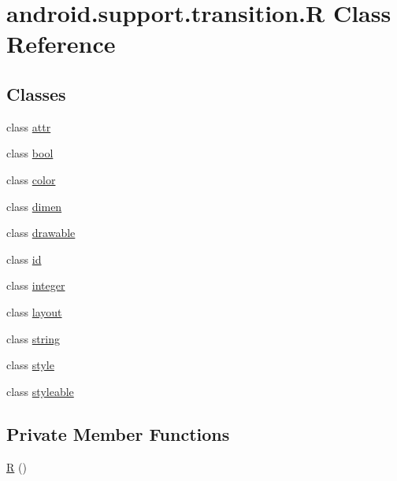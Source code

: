 \hypertarget{classandroid_1_1support_1_1transition_1_1_r}{}\section{android.\+support.\+transition.\+R Class Reference}
\label{classandroid_1_1support_1_1transition_1_1_r}
\subsection*{Classes}
\begin{DoxyCompactItemize}
\item 
class \mbox{\hyperlink{classandroid_1_1support_1_1transition_1_1_r_1_1attr}{attr}}
\item 
class \mbox{\hyperlink{classandroid_1_1support_1_1transition_1_1_r_1_1bool}{bool}}
\item 
class \mbox{\hyperlink{classandroid_1_1support_1_1transition_1_1_r_1_1color}{color}}
\item 
class \mbox{\hyperlink{classandroid_1_1support_1_1transition_1_1_r_1_1dimen}{dimen}}
\item 
class \mbox{\hyperlink{classandroid_1_1support_1_1transition_1_1_r_1_1drawable}{drawable}}
\item 
class \mbox{\hyperlink{classandroid_1_1support_1_1transition_1_1_r_1_1id}{id}}
\item 
class \mbox{\hyperlink{classandroid_1_1support_1_1transition_1_1_r_1_1integer}{integer}}
\item 
class \mbox{\hyperlink{classandroid_1_1support_1_1transition_1_1_r_1_1layout}{layout}}
\item 
class \mbox{\hyperlink{classandroid_1_1support_1_1transition_1_1_r_1_1string}{string}}
\item 
class \mbox{\hyperlink{classandroid_1_1support_1_1transition_1_1_r_1_1style}{style}}
\item 
class \mbox{\hyperlink{classandroid_1_1support_1_1transition_1_1_r_1_1styleable}{styleable}}
\end{DoxyCompactItemize}
\subsection*{Private Member Functions}
\begin{DoxyCompactItemize}
\item 
\mbox{\hyperlink{classandroid_1_1support_1_1transition_1_1_r_a49cf49904e6f9e2952a6503f2f307b08}{R}} ()
\end{DoxyCompactItemize}


